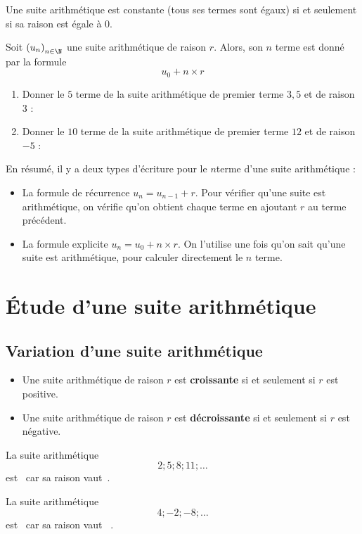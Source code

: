\documentclass{poly}
\begin{document}
\begin{remark}
Une suite arithmétique est constante (tous ses termes sont égaux) si et seulement si sa raison est égale à $0$.
\end{remark}
\begin{proposition}
Soit $\left(u_n\right)_{n \in \N}$ une suite arithmétique de raison $r$. Alors, son $n$\ieme{} terme est donné par la formule
\begin{equation*}
u_0 + n \times r
\end{equation*}
\end{proposition}
\begin{example}
\hfill
\begin{enumerate}[label=\emph{\alph*)}]
\item Donner le $5$\ieme{} terme de la suite arithmétique de premier terme $3,5$ et de raison $3$ : \answerline
\item Donner le $10$\ieme{} terme de la suite arithmétique de premier terme $12$ et de raison $-5$ : \answerline 
\end{enumerate}
\end{example}
\begin{tcolorbox}
En résumé, il y a deux types d'écriture pour le $n$\ieme terme d'une suite arithmétique :
\begin{itemize}
\item La formule de récurrence $u_n = u_{n - 1} + r$. Pour vérifier qu'une suite est arithmétique, on vérifie qu'on obtient chaque terme en ajoutant $r$ au terme précédent.
\item La formule explicite $u_n = u_0 + n \times r$. On l'utilise une fois qu'on sait qu'une suite est arithmétique, pour calculer directement le $n$\ieme{} terme.
\end{itemize} 
\end{tcolorbox}
\newpage
\section{Étude d'une suite arithmétique}
\subsection{Variation d'une suite arithmétique}
\begin{proposition}
\hfill
\begin{itemize}
\item Une suite arithmétique de raison $r$ est \textbf{croissante} si et seulement si $r$ est positive.
\item Une suite arithmétique de raison $r$ est \textbf{décroissante} si et seulement si $r$ est négative.
\end{itemize}
\end{proposition}
\begin{example}
La suite arithmétique
\begin{equation*}
2; 5; 8; 11; \dots 
\end{equation*}
est \answerline~car sa raison vaut~\answerline.

La suite arithmétique
\begin{equation*}
4; -2; -8; \dots 
\end{equation*}
est \answerline~car sa raison vaut~ \answerline.
\end{example}
\end{document}
